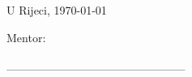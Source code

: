 \vspace{\baselineskip}

\vspace{\baselineskip}

\vspace{\baselineskip}

\vspace{\baselineskip}

\vspace{\baselineskip}

\vspace{\baselineskip}

\vspace{\baselineskip}

\vspace{\baselineskip}

\vspace{\baselineskip}



\begin{flushleft}
	{U Rijeci, {\today}}
\end{flushleft}\par

\vspace{\baselineskip}


\begin{flushright}
	Mentor:
\end{flushright}


\begin{flushright}
\_\_\_\_\_\_\_\_\_\_\_\_\_\_\_\_\_\_\_\_\_
\end{flushright}

\newpage

\thispagestyle{empty}
\mbox{}
\thispagestyle{empty}
